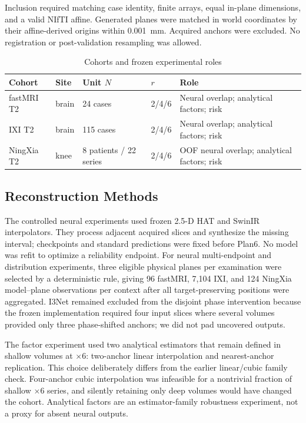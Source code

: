 \documentclass[journal,10pt]{IEEEtran}
\begin{document}
Inclusion required matching case identity, finite arrays, equal in-plane dimensions, and a valid NIfTI affine. Generated planes were matched in world coordinates by their affine-derived origins within 0.001~mm. Acquired anchors were excluded. No registration or post-validation resampling was allowed.

\begin{table}[t]
\caption{Cohorts and frozen experimental roles}
\label{tab:data}\centering
\begin{tabular}{p{1.05cm}p{.72cm}p{1.25cm}p{.58cm}p{2.3cm}}
\toprule
Cohort & Site & Unit $N$ & $r$ & Role \\
\midrule
fastMRI T2 & brain & 24 cases & 2/4/6 & Neural overlap; analytical factors; risk \\
IXI T2 & brain & 115 cases & 2/4/6 & Neural overlap; analytical factors; risk \\
NingXia T2 & knee & 8 patients / 22 series & 2/4/6 & OOF neural overlap; analytical factors; risk \\
\bottomrule
\end{tabular}
\end{table}

\subsection{Reconstruction Methods}
The controlled neural experiments used frozen 2.5-D HAT and SwinIR interpolators. They process adjacent acquired slices and synthesize the missing interval; checkpoints and standard predictions were fixed before Plan6. No model was refit to optimize a reliability endpoint. For neural multi-endpoint and distribution experiments, three eligible physical planes per examination were selected by a deterministic rule, giving 96 fastMRI, 7,104 IXI, and 124 NingXia model--plane observations per context after all target-preserving positions were aggregated. I3Net remained excluded from the disjoint phase intervention because the frozen implementation required four input slices where several volumes provided only three phase-shifted anchors; we did not pad uncovered outputs.

The factor experiment used two analytical estimators that remain defined in shallow volumes at $\times6$: two-anchor linear interpolation and nearest-anchor replication. This choice deliberately differs from the earlier linear/cubic family check. Four-anchor cubic interpolation was infeasible for a nontrivial fraction of shallow $\times6$ series, and silently retaining only deep volumes would have changed the cohort. Analytical factors are an estimator-family robustness experiment, not a proxy for absent neural outputs.
\end{document}
